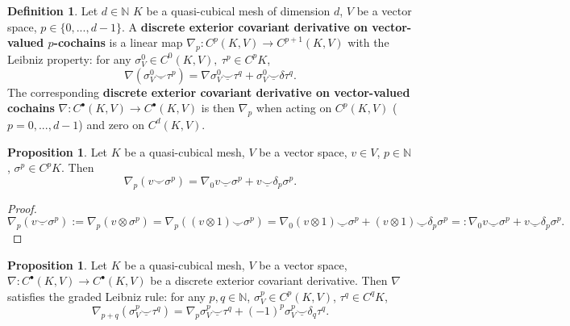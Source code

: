 \documentclass[fleqn]{article}
\theoremstyle{definition}
\newtheorem{proposition}[theorem]{Proposition}
\newtheorem{definition}[theorem]{Definition}
\newcommand{\N}{\mathbb{N}}
\newcommand{\usmile}{\underline{\smile}}
\begin{document}
\begin{definition}
  Let
    $d \in \N$
    $K$ be a quasi-cubical mesh of dimension $d$,
    $V$ be a vector space,
    $p \in \{0, ..., d - 1\}$.
  A \textbf{discrete exterior covariant derivative on vector-valued
  $p$-cochains} is a linear map
  $\nabla_p \colon C^p(K, V) \to C^{p + 1}(K, V)$ with the Leibniz property:
  for any $\sigma_V^0 \in C^0(K, V),\ \tau^p \in C^p K$,
  \begin{equation}
    \nabla(\sigma_V^0 \usmile \tau^p)
    = \nabla \sigma_V^0 \usmile \tau^q + \sigma_V^0 \usmile \delta \tau^q.
  \end{equation}
  The corresponding
  \textbf{discrete exterior covariant derivative on vector-valued cochains}
  $\nabla \colon C^\bullet(K, V) \to C^\bullet(K, V)$
  is then $\nabla_p$ when acting on $C^p(K, V)$ ($p = 0, ..., d - 1$)
  and zero on $C^d(K, V)$.
\end{definition}

\begin{proposition}
  Let
    $K$ be a quasi-cubical mesh,
    $V$ be a vector space,
    $v \in V$,
    $p \in \N$,
    $\sigma^p \in C^p K$.
  Then
  \begin{equation}
    \nabla_p(v \usmile \sigma^p)
    = \nabla_0 v \usmile \sigma^p + v \usmile \delta_p \sigma^p.
  \end{equation}
\end{proposition}

\begin{proof}
  \begin{equation}
    \nabla_p(v \usmile \sigma^p)
    := \nabla_p(v \otimes \sigma^p)
    = \nabla_p((v \otimes 1) \usmile \sigma^p)
    = \nabla_0(v \otimes 1) \usmile \sigma^p
      + (v \otimes 1) \usmile \delta_p \sigma^p
    =: \nabla_0 v \usmile \sigma^p + v \usmile \delta_p \sigma^p.
  \end{equation}
\end{proof}

\begin{proposition}
  Let
    $K$ be a quasi-cubical mesh,
    $V$ be a vector space,
    $\nabla \colon C^\bullet(K, V) \to C^\bullet(K, V)$ be
      a discrete exterior covariant derivative.
  Then $\nabla$ satisfies the graded Leibniz rule:
  for any $p, q \in \N$, $\sigma_V^p \in C^p(K, V)$, $\tau^q \in C^q K$,
  \begin{equation}
    \nabla_{p + q}(\sigma_V^p \usmile \tau^q)
    = \nabla_p \sigma_V^p \usmile \tau^q
      + (-1)^p \sigma_V^p \usmile \delta_q \tau^q.
  \end{equation}
\end{proposition}
\end{document}
